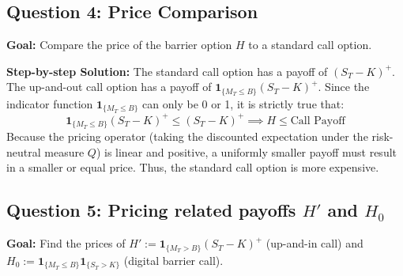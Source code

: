 \subsection*{Question 4: Price Comparison}
\textbf{Goal:} Compare the price of the barrier option $H$ to a standard call option.

\vspace{0.5cm}
\noindent \textbf{Step-by-step Solution:}
The standard call option has a payoff of $(S_T - K)^+$. The up-and-out call option has a payoff of $\mathbf{1}_{\{M_T \le B\}}(S_T - K)^+$. 
Since the indicator function $\mathbf{1}_{\{M_T \le B\}}$ can only be 0 or 1, it is strictly true that:
\begin{equation*}
    \mathbf{1}_{\{M_T \le B\}}(S_T - K)^+ \le (S_T - K)^+ \implies H \le \text{Call Payoff}
\end{equation*}
Because the pricing operator (taking the discounted expectation under the risk-neutral measure $Q$) is linear and positive, a uniformly smaller payoff must result in a smaller or equal price. Thus, the standard call option is more expensive.

\subsection*{Question 5: Pricing related payoffs $H'$ and $H_0$}
\textbf{Goal:} Find the prices of $H' := \mathbf{1}_{\{M_T > B\}}(S_T - K)^+$ (up-and-in call) and $H_0 := \mathbf{1}_{\{M_T \le B\}}\mathbf{1}_{\{S_T > K\}}$ (digital barrier call).

